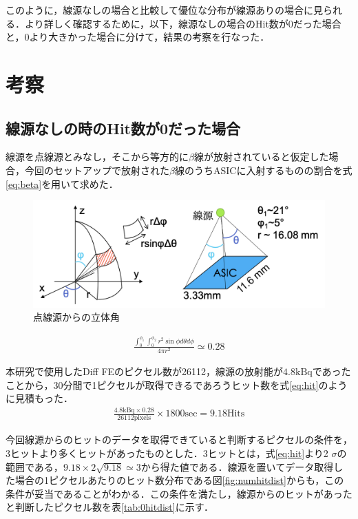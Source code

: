 このように，線源なしの場合と比較して優位な分布が線源ありの場合に見られる．より詳しく確認するために，以下，線源なしの場合のHit数が0だった場合と，0より大きかった場合に分けて，結果の考察を行なった．

\section{考察}
\label{sec:selfsum}
\subsection*{線源なしの時のHit数が0だった場合}
線源を点線源とみなし，そこから等方的に$\beta$線が放射されていると仮定した場合，今回のセットアップで放射された$\beta$線のうちASICに入射するものの割合を式\ref{eq:beta}を用いて求めた．
\begin{figure}[h]
  \centering
  \includegraphics[width=12cm]{./figure/selfarg.png}
  \caption{点線源からの立体角}
\end{figure}

\begin{eqnarray}
  \label{eq:beta}
  \frac{\int^{\phi_1}_0 \int^{\phi_2}_0 r^2 \sin \phi d\theta d\phi}{4 \pi r^2} \simeq 0.28
\end{eqnarray}

本研究で使用したDiff FEのピクセル数が26112，線源の放射能が$4.8 \mathrm{kBq}$であったことから，30分間で1ピクセルが取得できるであろうヒット数を式\ref{eq:hit}のように見積もった．
\begin{eqnarray}
  \label{eq:hit}
  \frac{4.8 \mathrm{kBq} \times 0.28}{26112 \mathrm{pixels}} \times 1800 \mathrm{sec} = 9.18 \mathrm{Hits}
\end{eqnarray}

今回線源からのヒットのデータを取得できていると判断するピクセルの条件を，3ヒットより多くヒットがあったものとした．3ヒットとは，式\ref{eq:hit}より2 $\sigma$の範囲である，$9.18 \times 2 \sqrt{9.18} \simeq 3$から得た値である．線源を置いてデータ取得した場合の1ピクセルあたりのヒット数分布である図\ref{fig:numhitdist}からも，この条件が妥当であることがわかる．この条件を満たし，線源からのヒットがあったと判断したピクセル数を表\ref{tab:0hitdist}に示す．

